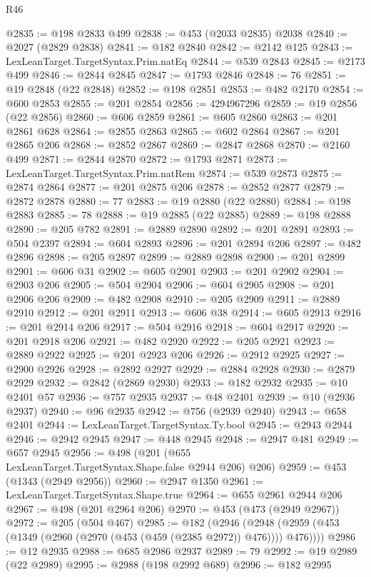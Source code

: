 \begin{lexlean}{R46}
\begin{coremodule}
@2835 := @198 @2833 @499
@2838 := @453 (@2033 @2835) @2038
@2840 := @2027 (@2829 @2838)
@2841 := @182 @2840
@2842 := @2142 @125
@2843 := LexLeanTarget.TargetSyntax.Prim.natEq
@2844 := @539 @2843
@2845 := @2173 @499
@2846 := @2844 @2845
@2847 := @1793 @2846
@2848 := 76
@2851 := @19 @2848 (@22 @2848)
@2852 := @198 @2851
@2853 := @482 @2170
@2854 := @600 @2853
@2855 := @201 @2854
@2856 := 4294967296
@2859 := @19 @2856 (@22 @2856)
@2860 := @606 @2859
@2861 := @605 @2860
@2863 := @201 @2861 @628
@2864 := @2855 @2863
@2865 := @602 @2864
@2867 := @201 @2865 @206
@2868 := @2852 @2867
@2869 := @2847 @2868
@2870 := @2160 @499
@2871 := @2844 @2870
@2872 := @1793 @2871
@2873 := LexLeanTarget.TargetSyntax.Prim.natRem
@2874 := @539 @2873
@2875 := @2874 @2864
@2877 := @201 @2875 @206
@2878 := @2852 @2877
@2879 := @2872 @2878
@2880 := 77
@2883 := @19 @2880 (@22 @2880)
@2884 := @198 @2883
@2885 := 78
@2888 := @19 @2885 (@22 @2885)
@2889 := @198 @2888
@2890 := @205 @782
@2891 := @2889 @2890
@2892 := @201 @2891
@2893 := @504 @2397
@2894 := @604 @2893
@2896 := @201 @2894 @206
@2897 := @482 @2896
@2898 := @205 @2897
@2899 := @2889 @2898
@2900 := @201 @2899
@2901 := @606 @31
@2902 := @605 @2901
@2903 := @201 @2902
@2904 := @2903 @206
@2905 := @504 @2904
@2906 := @604 @2905
@2908 := @201 @2906 @206
@2909 := @482 @2908
@2910 := @205 @2909
@2911 := @2889 @2910
@2912 := @201 @2911
@2913 := @606 @38
@2914 := @605 @2913
@2916 := @201 @2914 @206
@2917 := @504 @2916
@2918 := @604 @2917
@2920 := @201 @2918 @206
@2921 := @482 @2920
@2922 := @205 @2921
@2923 := @2889 @2922
@2925 := @201 @2923 @206
@2926 := @2912 @2925
@2927 := @2900 @2926
@2928 := @2892 @2927
@2929 := @2884 @2928
@2930 := @2879 @2929
@2932 := @2842 (@2869 @2930)
@2933 := @182 @2932
@2935 := @10 @2401 @57
@2936 := @757 @2935
@2937 := @48 @2401
@2939 := @10 (@2936 @2937)
@2940 := @96 @2935
@2942 := @756 (@2939 @2940)
@2943 := @658 @2401
@2944 := LexLeanTarget.TargetSyntax.Ty.bool
@2945 := @2943 @2944
@2946 := @2942 @2945
@2947 := @448 @2945
@2948 := @2947 @481
@2949 := @657 @2945
@2956 := @498 (@201 (@655 LexLeanTarget.TargetSyntax.Shape.false @2944 @206) @206)
@2959 := @453 (@1343 (@2949 @2956))
@2960 := @2947 @1350
@2961 := LexLeanTarget.TargetSyntax.Shape.true
@2964 := @655 @2961 @2944 @206
@2967 := @498 (@201 @2964 @206)
@2970 := @453 (@473 (@2949 @2967))
@2972 := @205 (@504 @467)
@2985 := @182
    (@2946 (@2948 (@2959 (@453 (@1349 (@2960 (@2970 (@453 (@459 (@2385 @2972)) @476)))) @476))))
@2986 := @12 @2935
@2988 := @685 @2986 @2937
@2989 := 79
@2992 := @19 @2989 (@22 @2989)
@2995 := @2988 (@198 @2992 @689)
@2996 := @182 @2995

\end{coremodule}
\end{lexlean}
